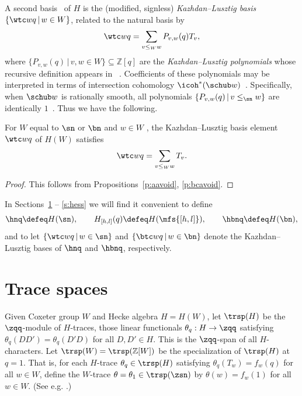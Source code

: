 A second basis~\cite{KLRepCH} of $H$ is the (modified, signless)
{\em Kazhdan--Lusztig basis} $\{ \wtc wq \,|\, w \in W \}$,
related to the natural basis by
\begin{equation*}
  \wtc wq = \sum_{v \leq_W w} P_{v,w}(q) T_v,
\end{equation*}
where
$\{ P_{v,w}(q) \,|\, v, w \in W \} \subseteq \mathbb Z[q]$ are the
{\em Kazhdan--Lusztig polynomials}
whose recursive definition appears in ~\cite{KLRepCH}.
Coefficients of these polynomials may be interpreted in terms of
intersection cohomology $\icoh^*(\schub w)$~\cite{KLSchub}.  Specifically,
when $\schub w$ is rationally smooth,
all
polynomials
$\{P_{v,w}(q) \,|\, v \leq_{\sn} w\}$
are identically
$1$~\cite[Thm.\,A.2]{KLRepCH}.
Thus we have the following.
\begin{prop}\label{p:abcsmoothkl}
  For $W$ equal to $\sn$ or $\bn$ and $w \in W$ \avoidingp,
  the Kazhdan--Lusztig basis element $\wtc wq$
  of $H(W)$
  satisfies
  \begin{equation*}
    \wtc wq = \sum_{v \leq_W w} T_v.
  \end{equation*}
\end{prop}
\begin{proof}
  This follows from Propositions~\ref{p:aavoid}, \ref{p:bcavoid}.
  \end{proof}


In Sections~\ref{s:trace} -- \ref{s:hess} we will find it convenient to define
\begin{equation*}
  \hnq \defeq H(\sn), \qquad
  H_{[h,l]}(q) \defeq H(\mfs{[h,l]}), \qquad
  \hbnq \defeq H(\bn),
  \end{equation*}
and to let $\{ \wtc wq \,|\, w \in \sn \}$ and $\{ \btc wq \,|\, w \in \bn \}$
denote the Kazhdan--Lusztig bases of $\hnq$ and $\hbnq$, respectively.

\section{Trace spaces}\label{s:trace}

Given
Coxeter group $W$ and
Hecke algebra $H = H(W)$,
let $\trsp(H)$ be the $\zqq$-module of $H$-traces, 
those linear functionals $\theta_q: H \rightarrow \zqq$ satisfying
$\theta_q(DD') = \theta_q(D'D)$ for all $D, D' \in H$.
This is the $\zqq$-span of all $H$-characters.
Let $\trsp(W) = \trsp(\mathbb Z[W])$
be the specialization of $\trsp(H)$ at $q=1$.
That is,
for each $H$-trace
$\theta_q \in \trsp(H)$ satisfying
$\theta_q(T_w) = f_w(q)$
for all $w \in W$,
define the $W$-trace
$\theta = \theta_1 \in \trsp(\zsn)$ by
$\theta(w) = f_w(1)$ for all $w \in W$.
(See e.g. \cite{GPCharHecke}.)

